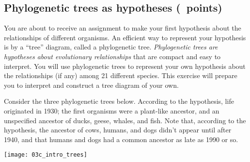 \documentclass[12pt, addpoints, hidelinks]{exam}
\begin{document}
\subsection*{Phylogenetic trees as hypotheses (\numpoints\ points)}

You are about to receive an assignment to make your first hypothesis
about the relationships of different organisms. An efficient way to 
represent your hypothesis is by a “tree” diagram,
called a phylogenetic tree. \emph{Phylogenetic trees are hypotheses 
about evolutionary relationships} that are compact and easy to
interpret. You will use phylogenetic trees to represent your own
hypothesis about the relationships (if any) among 21 different
species. This exercise will prepare you to interpret and construct a
tree diagram of your own.

Consider the three phylogenetic trees below. According to the hypothesis, life originated
in 1930; the first organisms were a plant-like ancestor, and an unspecified
ancestor of ducks, geese, whales, and fish. Note that, according to the hypothesis, 
the ancestor of cows, humans, and dogs didn't appear until after 1940, and that humans
and dogs had a common ancestor as late as 1990 or so.

\vspace*{1\baselineskip}

\noindent\texttt{[image: 03c\_intro\_trees]}
\end{document}
